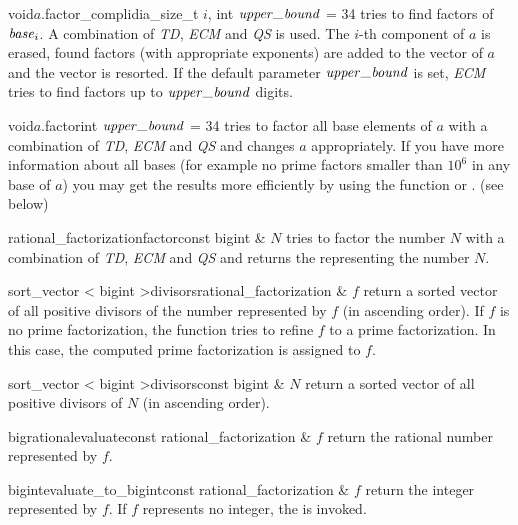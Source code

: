 \begin{fcode}{void}{$a$.factor_comp}{lidia_size_t $i$, int $\upperbound$ = 34}
  tries to find factors of $\mathit{base}_i$.  A combination of \emph{TD}, \emph{ECM} and \emph{QS} is
  used.  The $i$-th component of $a$ is erased, found factors (with appropriate exponents) are
  added to the vector of $a$ and the vector is resorted.  If the default parameter $\upperbound$
  is set, \emph{ECM} tries to find factors up to $\upperbound$ digits.
\end{fcode}

\begin{fcode}{void}{$a$.factor}{int $\upperbound$ = 34}
  tries to factor all base elements of $a$ with a combination of \emph{TD}, \emph{ECM} and
  \emph{QS} and changes $a$ appropriately.  If you have more information about all bases (for
  example no prime factors smaller than $10^6$ in any base of $a$) you may get the results more
  efficiently by using the function  or .  (see below)
\end{fcode}

\begin{fcode}{rational_factorization}{factor}{const bigint & $N$}
  tries to factor the number $N$ with a combination of \emph{TD}, \emph{ECM} and \emph{QS} and
  returns the  representing the number $N$.
\end{fcode}

\begin{fcode}{sort_vector < bigint >}{divisors}{rational_factorization & $f$}
  return a sorted vector of all positive divisors of the number represented by $f$ (in ascending
  order).  If $f$ is no prime factorization, the function tries to refine $f$ to a prime
  factorization.  In this case, the computed prime factorization is assigned to $f$.
\end{fcode}

\begin{fcode}{sort_vector < bigint >}{divisors}{const bigint & $N$}
  return a sorted vector of all positive divisors of $N$ (in ascending order).
\end{fcode}

\begin{fcode}{bigrational}{evaluate}{const rational_factorization & $f$}
  return the rational number represented by $f$.
\end{fcode}

\begin{fcode}{bigint}{evaluate_to_bigint}{const rational_factorization & $f$}
  return the integer represented by $f$.  If $f$ represents no integer, the \LEH is invoked.
\end{fcode}


